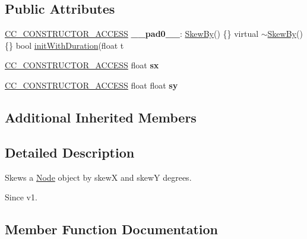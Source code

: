 \subsection*{Public Attributes}
\begin{DoxyCompactItemize}
\item 
\mbox{\label{classSkewBy_aea0a109edc46da23ee02773df91901ed}} 
\hyperlink{_2cocos2d_2cocos_2base_2ccConfig_8h_a25ef1314f97c35a2ed3d029b0ead6da0}{C\+C\+\_\+\+C\+O\+N\+S\+T\+R\+U\+C\+T\+O\+R\+\_\+\+A\+C\+C\+E\+SS} {\bfseries \+\_\+\+\_\+pad0\+\_\+\+\_\+}\+: \hyperlink{classSkewBy}{Skew\+By}() \{\} virtual $\sim$\hyperlink{classSkewBy}{Skew\+By}() \{\} bool \hyperlink{classSkewTo_a54f300d6317d235cf978e871f9286c9f}{init\+With\+Duration}(float t
\item 
\mbox{\label{classSkewBy_a631da4ac2cd36ea5021e63eea6739ead}} 
\hyperlink{_2cocos2d_2cocos_2base_2ccConfig_8h_a25ef1314f97c35a2ed3d029b0ead6da0}{C\+C\+\_\+\+C\+O\+N\+S\+T\+R\+U\+C\+T\+O\+R\+\_\+\+A\+C\+C\+E\+SS} float {\bfseries sx}
\item 
\mbox{\label{classSkewBy_a431c393a9214df8de4755a51dc0b9cfe}} 
\hyperlink{_2cocos2d_2cocos_2base_2ccConfig_8h_a25ef1314f97c35a2ed3d029b0ead6da0}{C\+C\+\_\+\+C\+O\+N\+S\+T\+R\+U\+C\+T\+O\+R\+\_\+\+A\+C\+C\+E\+SS} float float {\bfseries sy}
\end{DoxyCompactItemize}
\subsection*{Additional Inherited Members}


\subsection{Detailed Description}
Skews a \hyperlink{classNode}{Node} object by skewX and skewY degrees. 

\begin{DoxySince}{Since}
v1. 
\end{DoxySince}


\subsection{Member Function Documentation}
\mbox{\label{classSkewBy_ae18e543aa3c28c8365543ae751530aff}} 
